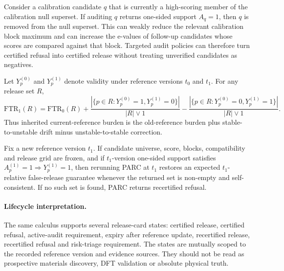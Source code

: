 \begin{proposition}
Consider a calibration candidate \(q\) that is currently a high-scoring member
of the calibration null superset.  If auditing \(q\) returns one-sided support
\(A_q=1\), then \(q\) is removed from the null superset.  This can weakly reduce
the relevant calibration block maximum and can increase the e-values of
follow-up candidates whose scores are compared against that block.  Targeted
audit policies can therefore turn certified refusal into certified release
without treating unverified candidates as negatives.
\end{proposition}

\begin{proposition}
Let \(Y_p^{(0)}\) and \(Y_p^{(1)}\) denote validity under reference versions
\(t_0\) and \(t_1\).  For any release set \(R\),
\[
 \mathrm{FTR}_{1}(R)
 =
 \mathrm{FTR}_{0}(R)
 + \frac{|\{p\in R:Y_p^{(0)}=1,Y_p^{(1)}=0\}|}{|R|\vee 1}
 - \frac{|\{p\in R:Y_p^{(0)}=0,Y_p^{(1)}=1\}|}{|R|\vee 1}.
\]
Thus inherited current-reference burden is the old-reference burden plus
stable-to-unstable drift minus unstable-to-stable correction.
\end{proposition}

\begin{theorem}
Fix a new reference version \(t_1\).  If candidate universe, score, blocks,
compatibility and release grid are frozen, and if \(t_1\)-version one-sided
support satisfies \(A_p^{(1)}=1\Rightarrow Y_p^{(1)}=1\), then rerunning PARC
at \(t_1\) restores an expected \(t_1\)-relative false-release guarantee
whenever the returned set is non-empty and self-consistent.  If no such set is
found, PARC returns recertified refusal.
\end{theorem}

\paragraph{Lifecycle interpretation.}
The same calculus supports several release-card states: certified release,
certified refusal, active-audit requirement, expiry after reference update,
recertified release, recertified refusal and risk-triage requirement.  The
states are mutually scoped to the recorded reference version and evidence
sources.  They should not be read as prospective materials discovery, DFT
validation or absolute physical truth.
